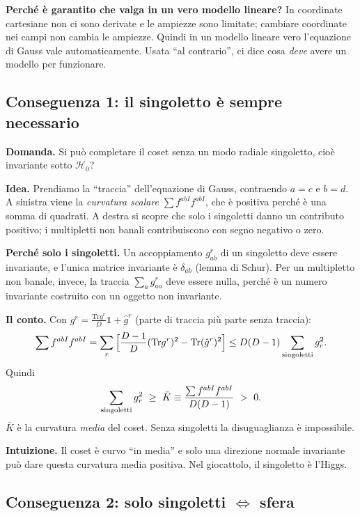\documentclass[11pt,a4paper]{article}
\numberwithin{equation}{section}
\theoremstyle{remark}
\newcommand{\Tr}{\mathrm{Tr}}
\newcommand{\Hg}{\mathcal{H}_0}
\newcommand{\one}{\mathbb{1}}
\begin{document}
\textbf{Perché è garantito che valga in un vero modello lineare?} In coordinate cartesiane non ci sono derivate e le ampiezze sono limitate; cambiare coordinate nei campi non cambia le ampiezze. Quindi in un modello lineare vero l'equazione di Gauss vale automaticamente. Usata ``al contrario'', ci dice cosa \emph{deve} avere un modello per funzionare.

\subsection{Conseguenza 1: il singoletto è sempre necessario}

\textbf{Domanda.} Si può completare il coset senza un modo radiale singoletto, cioè invariante sotto $\Hg$?

\textbf{Idea.} Prendiamo la ``traccia'' dell'equazione di Gauss, contraendo $a=c$ e $b=d$. A sinistra viene la \emph{curvatura scalare} $\sum f^{abI}f^{abI}$, che è positiva perché è una somma di quadrati. A destra si scopre che solo i singoletti danno un contributo positivo; i multipletti non banali contribuiscono con segno negativo o zero.

\textbf{Perché solo i singoletti.} Un accoppiamento $g^r_{ab}$ di un singoletto deve essere invariante, e l'unica matrice invariante è $\delta_{ab}$ (lemma di Schur). Per un multipletto non banale, invece, la traccia $\sum_a g^r_{aa}$ deve essere nulla, perché è un numero invariante costruito con un oggetto non invariante.

\textbf{Il conto.} Con $g^r=\frac{\Tr g^r}{D}\one+\hat g^r$ (parte di traccia più parte senza traccia):
\[
\sum f^{abI}f^{abI}=\sum_r\Big[\frac{D-1}{D}(\Tr g^r)^2-\Tr(\hat g^r)^2\Big]\le D(D-1)\sum_{\rm singoletti}g_r^2 .
\]
Quindi
\begin{equation}
\sum_{\rm singoletti}g_r^2\ \ge\ \bar K\equiv\frac{\sum f^{abI}f^{abI}}{D(D-1)}\ >\ 0 .
\end{equation}
$\bar K$ è la curvatura \emph{media} del coset. Senza singoletti la disuguaglianza è impossibile.

\textbf{Intuizione.} Il coset è curvo ``in media'' e solo una direzione normale invariante può dare questa curvatura media positiva. Nel giocattolo, il singoletto è l'Higgs.

\subsection{Conseguenza 2: solo singoletti $\iff$ sfera}
\end{document}
